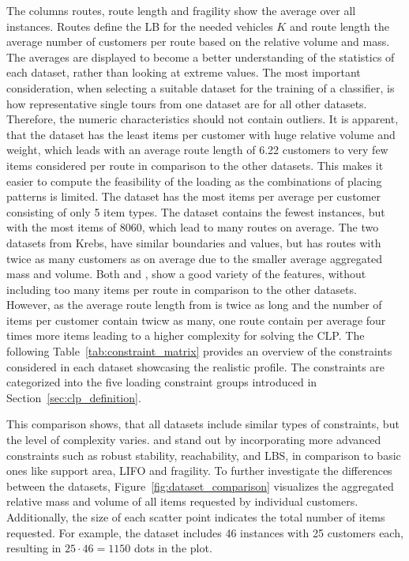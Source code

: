 

The columns routes, route length and fragility show the average over all instances.
Routes define the \gls{LB} for the needed vehicles $K$ and route length the average number of customers per route based
on the relative volume and mass. The averages are displayed to become a better understanding of the
statistics of each dataset, rather than looking at extreme values.
The most important consideration, when selecting a suitable dataset for the training of a classifier,
is how representative single tours from one dataset are for all other datasets. Therefore, the numeric characteristics
should not contain outliers. It is apparent, that the \gendreauDataSetText dataset has the least items per customer
with huge relative volume and weight, which leads with an average route length of 6.22 customers to very few items
considered per route in comparison to the other datasets. This makes it easier to compute the feasibility of the loading
as the combinations of placing patterns is limited. The \mouraDataSetText dataset has the most items per average per customer consisting
of only 5 item types. The \ceschiaDataSetText dataset contains the fewest instances, but with the most items of 8060,
which lead to many routes on average. The two datasets from Krebs, have similar
boundaries and values, but \krebsBDataSetText has routes with twice as many customers as \krebsADataSetText on average due
to the smaller average aggregated mass and volume. Both \krebsADataSetText and \gendreauDataSetText,
show a good variety of the features, without including too many items per route in comparison to the other datasets.
However, as the average route length from \krebsADataSetText is twice as long and the number of items per customer contain twicw as many,
one route contain per average four times more items leading to a higher complexity for solving the \gls{CLP}.
The following Table~\ref{tab:constraint_matrix} provides an overview of the constraints considered
in each dataset showcasing the realistic profile. The constraints are categorized into the five loading constraint groups introduced
in Section~\ref{sec:clp_definition}.
\clearpage


This comparison shows, that all datasets include similar types of constraints, but the level
of complexity varies. \krebsADataSetText and \ceschiaDataSetText stand out by incorporating
more advanced constraints such as robust stability, reachability, and \gls{LBS}, in comparison to
basic ones like support area, \gls{LIFO} and fragility. To further investigate the differences
between the datasets, Figure~\ref{fig:dataset_comparison} visualizes the aggregated relative mass and
volume of all items requested by individual customers.
Additionally, the size of each scatter point indicates the total number of items requested.
For example, the \mouraDataSetText dataset includes 46
instances with 25 customers each, resulting in $25 \cdot 46 = 1150$ dots in the plot.

